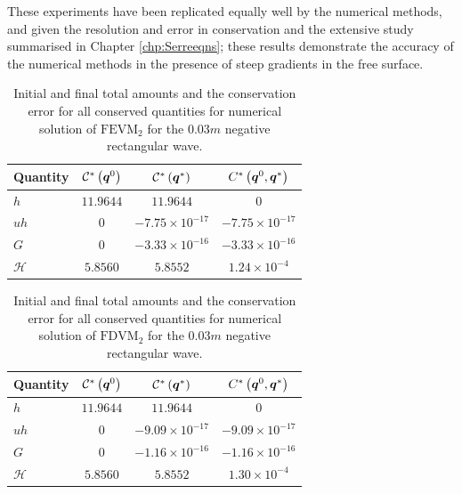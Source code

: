 These experiments have been replicated equally well by the numerical methods, and given the resolution and error in conservation and the extensive study summarised in Chapter \ref{chp:Serreeqns}; these results demonstrate the accuracy of the numerical methods in the presence of steep gradients in the free surface.     
%
\begin{table}
	\centering
	\begin{tabular}{l  c  c c}
		Quantity& $\mathcal{C}^*\left(\boldsymbol{q}^0\right)$ & $\mathcal{C}^*\left(\boldsymbol{q}^*\right)$ & ${C}^*\left(\boldsymbol{q}^0,\boldsymbol{q}^*\right)$ \B \\
		\hline 
		$h$ & $11.9644$ & $11.9644$ & $0$ \T\\
		$uh$ & $0$ & $-7.75 \times 10^{-17}$ & $-7.75\times 10^{-17}$\\
		$G$ & $0$ & $-3.33\times 10^{-16}$ & $-3.33\times 10^{-16}$\\
		$\mathcal{H}$ & $5.8560$ & $5.8552$ & $1.24 \times 10^{-4}$  \B \\
		\hline
	\end{tabular}
	\caption{Initial and final total amounts and the conservation error for all conserved quantities for numerical solution of $\text{FEVM}_2$ for the $0.03m$ negative rectangular wave.}
	\label{tab:ConservationSegurFEVM3cm}
\end{table} 
%
\begin{table}
	\centering
	\begin{tabular}{l  c  c c}
		Quantity& $\mathcal{C}^*\left(\boldsymbol{q}^0\right)$ & $\mathcal{C}^*\left(\boldsymbol{q}^*\right)$ & ${C}^*\left(\boldsymbol{q}^0,\boldsymbol{q}^*\right)$ \B \\
		\hline
		$h$ & $11.9644$ & $11.9644$ & $0$ \T\\
		$uh$ & $0$ & $-9.09 \times 10^{-17}$ & $-9.09 \times 10^{-17}$\\
		$G$ & $0$ & $-1.16\times 10^{-16}$ & $-1.16\times 10^{-16}$\\
		$\mathcal{H}$ & $5.8560$ & $5.8552$ & $1.30 \times 10^{-4}$ \B\\
		\hline
	\end{tabular}
	\caption{Initial and final total amounts and the conservation error for all conserved quantities for numerical solution of $\text{FDVM}_2$ for the $0.03m$ negative rectangular wave.}
	\label{tab:ConservationSegurFDVM3cm}
\end{table}  

